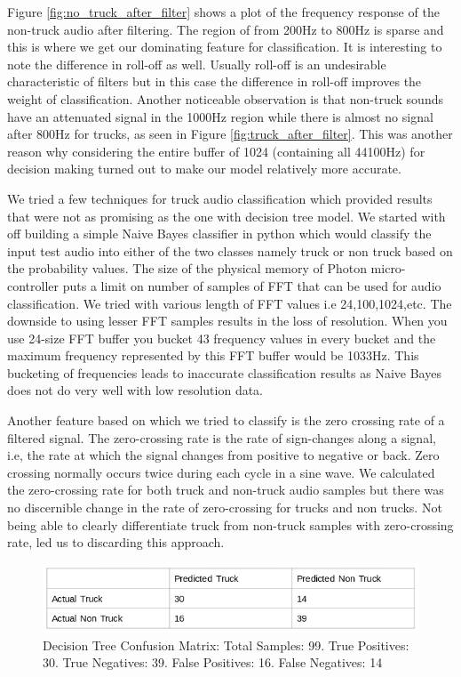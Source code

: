 \documentclass[sigconf, authorversion=false,  screen=true]{acmart}
\begin{document}
	Figure \ref{fig:no_truck_after_filter} shows a plot of the frequency response of the non-truck audio after filtering. The region of from 200Hz to 800Hz is sparse and this is where we get our dominating feature for classification. It is interesting to note the difference in roll-off as well. Usually roll-off is an undesirable characteristic of filters but in this case the difference in roll-off improves the weight of classification. Another noticeable observation is that non-truck sounds have an attenuated signal in the 1000Hz region while there is almost no signal after 800Hz for trucks, as seen in Figure \ref{fig:truck_after_filter}. This was another reason why considering the entire buffer of 1024 (containing all 44100Hz) for decision making turned out to make our model relatively more accurate.

	We tried a few techniques for truck audio classification which provided results that were not as  promising as the one with decision tree model. We started with off building a simple Naive Bayes classifier in python which would classify the input test audio into either of the two classes namely truck or non truck based on the probability values. The size of the physical memory of Photon micro-controller puts a limit on number of samples of FFT that can be used for audio classification. We tried with various length of FFT values i.e 24,100,1024,etc. The downside to using lesser FFT samples results in the loss of resolution. When you use 24-size FFT buffer you bucket 43 frequency values in every bucket and the maximum frequency represented by this FFT buffer would be 1033Hz. This bucketing of frequencies leads to inaccurate classification results as Naive Bayes does not do very well with low resolution data.  

	Another feature based on which we tried to classify is the zero crossing rate of a filtered signal. The zero-crossing rate is the rate of sign-changes along a signal, i.e, the rate at which the signal changes from positive to negative or back. Zero crossing normally occurs twice during each cycle in a sine wave. We calculated the zero-crossing rate for both truck and non-truck audio samples but there was no discernible change in the rate of zero-crossing for trucks and non trucks. Not being able to clearly differentiate truck from non-truck samples with zero-crossing rate, led us to discarding this approach.
	
	\begin{figure}
		\includegraphics[width=\linewidth]{confusion}
		\caption{Decision Tree Confusion Matrix: Total Samples: 99. True Positives: 30. True Negatives: 39. False Positives: 16. False Negatives: 14}
		\label{fig:confusion}
	\end{figure}
	
\end{document}
